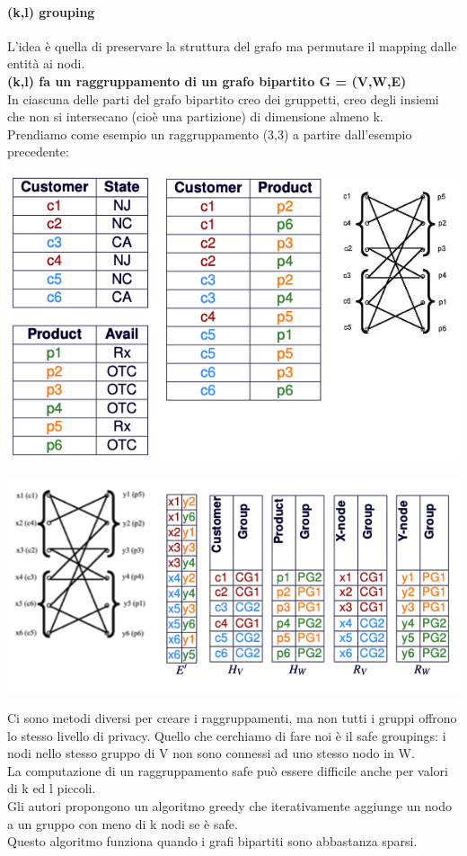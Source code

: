 \paragraph{(k,l) grouping} L'idea è quella di preservare la struttura del grafo ma permutare il mapping dalle entità ai nodi. \\
\textbf{(k,l) fa un raggruppamento di un grafo bipartito G = (V,W,E)}\\
In ciascuna delle parti del grafo bipartito creo dei gruppetti, creo degli insiemi che non si intersecano (cioè una partizione) di dimensione almeno k.\\
Prendiamo come esempio un raggruppamento (3,3) a partire dall'esempio precedente:
\begin{center}
    \includegraphics[scale=0.5]{img/grouping-1.png}
\end{center}
\begin{center}
    \includegraphics[scale=0.5]{img/grouping-2.png}
\end{center}
Ci sono metodi diversi per creare i raggruppamenti, ma non tutti i gruppi offrono lo stesso livello di privacy. Quello che cerchiamo di fare noi è il safe groupings: i nodi nello stesso gruppo di V non sono connessi ad uno stesso nodo in W.\\
La computazione di un raggruppamento safe può essere difficile anche per valori di k ed l piccoli.\\
Gli autori propongono un algoritmo greedy che iterativamente aggiunge un nodo a un gruppo con meno di k nodi se è safe.\\
Questo algoritmo funziona quando i grafi bipartiti sono abbastanza sparsi.

